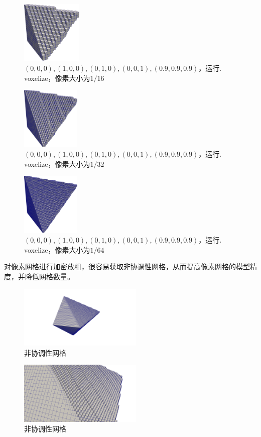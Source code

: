 \begin{figure}[!htbp]
  \centering
  \includegraphics[height=3cm]{fig/1/1.2/10.png}
    \caption{$(0,0,0),(1,0,0),(0,1,0),(0,0,1),(0.9,0.9,0.9)$，运行$.\\$voxelize，像素大小为$1/16$}
  \label{fig:1-7}
\end{figure}

\begin{figure}[!htbp]
  \centering
  \includegraphics[height=3cm]{fig/1/1.2/11.png}
    \caption{$(0,0,0),(1,0,0),(0,1,0),(0,0,1),(0.9,0.9,0.9)$，运行$.\\$voxelize，像素大小为$1/32$}
  \label{fig:1-7}
\end{figure}

\begin{figure}[!htbp]
  \centering
  \includegraphics[height=3cm]{fig/1/1.2/12.png}
    \caption{$(0,0,0),(1,0,0),(0,1,0),(0,0,1),(0.9,0.9,0.9)$，运行$.\\$voxelize，像素大小为$1/64$}
  \label{fig:1-7}
\end{figure}

\newpage

对像素网格进行加密放粗，很容易获取非协调性网格，从而提高像素网格的模型精度，并降低网格数量。

\begin{figure}[!htbp]
  \centering
  \includegraphics[height=3cm]{fig/1/1.2/13.png}
  \caption{非协调性网格}
  \label{fig:1-7}
\end{figure}

\begin{figure}[!htbp]
  \centering
  \includegraphics[height=3cm]{fig/1/1.2/14.png}
  \caption{非协调性网格}
  \label{fig:1-7}
\end{figure}

